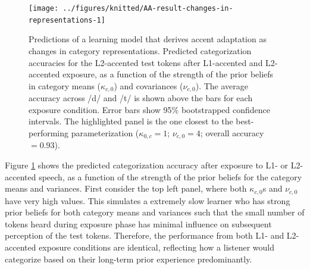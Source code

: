 \documentclass[
  11pt,
  english,
  man,floatsintext]{apa6}
\begin{document}
\begin{figure}

{\centering \texttt{[image: ../figures/knitted/AA-result-changes-in-representations-1]} 

}

\caption{Predictions of a learning model that derives accent adaptation as changes in category representations. Predicted categorization accuracies for the L2-accented test tokens after L1-accented and L2-accented exposure, as a function of the strength of the prior beliefs in category means (\(\kappa_{c,0}\)) and covariances (\(\nu_{c,0}\)). The average accuracy across /d/ and /t/ is shown above the bars for each exposure condition. Error bars show 95\% bootstrapped confidence intervals. The highlighted panel is the one closest to the best-performing parameterization (\(\kappa_{0,c} = 1\); \(\nu_{c,0}=4\); overall accuracy \(=0.93\)).}\label{fig:AA-result-changes-in-representations}
\end{figure}

Figure \ref{fig:AA-result-changes-in-representations} shows the predicted categorization accuracy after exposure to L1- or L2-accented speech, as a function of the strength of the prior beliefs for the category means and variances. First consider the top left panel, where both \(\kappa_{c,0}\)s and \(\nu_{c,0}\) have very high values. This simulates a extremely slow learner who has strong prior beliefs for both category means and variances such that the small number of tokens heard during exposure phase has minimal influence on subsequent perception of the test tokens. Therefore, the performance from both L1- and L2-accented exposure conditions are identical, reflecting how a listener would categorize based on their long-term prior experience predominantly.
\end{document}
